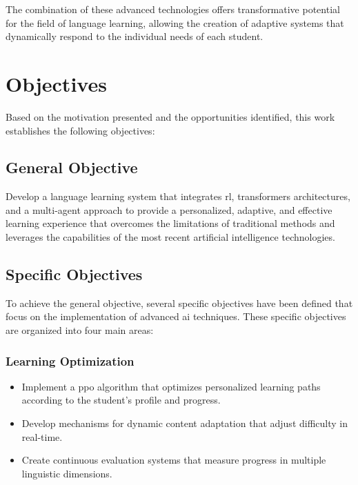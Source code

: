 The combination of these advanced technologies offers transformative potential for the field of language learning, allowing the creation of adaptive systems that dynamically respond to the individual needs of each student.

\section{Objectives}
\label{sec:objectives}

Based on the motivation presented and the opportunities identified, this work establishes the following objectives:

\subsection{General Objective}
\label{subsec:general-objective}

Develop a language learning system that integrates \gls{rl}, \gls{transformers} architectures, and a \gls{multi-agent} approach to provide a personalized, adaptive, and effective learning experience that overcomes the limitations of traditional methods and leverages the capabilities of the most recent artificial intelligence technologies.

\subsection{Specific Objectives}
\label{subsec:specific-objectives}

To achieve the general objective, several specific objectives have been defined that focus on the implementation of advanced \gls{ai} techniques. These specific objectives are organized into four main areas:

\subsubsection{Learning Optimization}
\label{subsubsec:learning-optimization}

\begin{itemize}
  \item Implement a \gls{ppo} algorithm that optimizes personalized learning paths according to the student's profile and progress.
  \item Develop mechanisms for dynamic content adaptation that adjust difficulty in real-time.
  \item Create continuous evaluation systems that measure progress in multiple linguistic dimensions.
\end{itemize}

